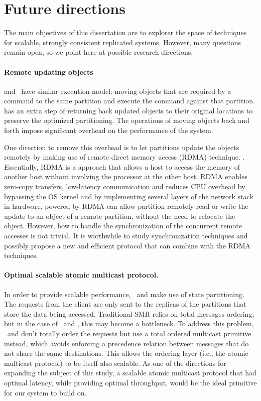 \section{Future directions}

The main objectives of this dissertation are to explorer the space of techniques
for scalable, strongly consistent replicated systems. However, many questions
remain open, so we point here at possible research directions.

\paragraph{Remote updating objects} \dynastar and \dssmr\ have similar execution
model: moving objects that are required by a command to the same partition and
execute the command against that partition. \dynastar has an extra step of
returning back updated objects to their original locations to preserve the
optimized partitioning. The operations of moving objects back and forth impose
significant overhead on the performance of the system. 

One direction to remove this overhead is to let partitions update the objects
remotely by making use of remote direct memory access (RDMA) technique.
\cite{recio2007remote,dragojevic2014farm}. Essentially, RDMA is a approach
that allows a host to access the memory of another host without involving the
processor at the other host. RDMA enables zero-copy transfers, low-latency
communication and reduces CPU overhead by bypassing the OS kernel and by
implementing several layers of the network stack in hardware. \dynastar powered
by RDMA can allow partition remotely read or write the update to an object
of a remote partition, without the need to relocate the object. However, how
to handle the synchronization of the concurrent remote accesses is not trivial.
It is worthwhile to study synchronization techniques and possibly propose a new
and efficient protocol that can combine \dynastar with the RDMA techniques.

\paragraph{Optimal scalable atomic multicast protocol.} 
In order to provide scalable performance, \dssmr\ and \dynastar make use of
state partitioning. The requests from the client are only sent to the replicas
of the partitions that store the data being accessed. Traditional SMR relies on
total messages ordering, but in the case of \dssmr\ and \dynastar, this may
become a bottleneck. To address this problem, \dssmr\ and \dynastar don't
totally order the requests but use a total ordered multicast primitive instead,
which avoids enforcing a precedence relation between messages that do not share
the same destinations. This allows the ordering layer (i.e., the atomic
multicast protocol) to be itself also scalable.  As one of the directions for
expanding the subject of this study, a scalable atomic multicast protocol that
had optimal latency, while providing optimal throughput, would be the ideal
primitive for our system to build on.


